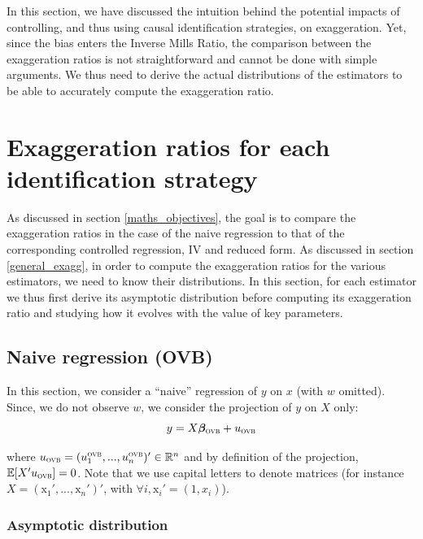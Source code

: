 \documentclass[a4paper, 11pt]{report}
\begin{document}
			In this section, we have discussed the intuition behind the potential impacts of controlling, and thus using causal identification strategies, on exaggeration. Yet, since the bias enters the Inverse Mills Ratio, the comparison between the exaggeration ratios is not straightforward and cannot be done with simple arguments. We thus need to derive the actual distributions of the estimators to be able to accurately compute the exaggeration ratio.
			

	\section{Exaggeration ratios for each identification strategy}
	
		As discussed in section \ref{maths_objectives}, the goal is to compare the exaggeration ratios in the case of the naive regression to that of the corresponding controlled regression, IV and reduced form. As discussed in section \ref{general_exagg}, in order to compute the exaggeration ratios for the various estimators, we need to know their distributions. In this section, for each estimator we thus first derive its asymptotic distribution before computing its exaggeration ratio and studying how it evolves with the value of key parameters. 

		
		\subsection{Naive regression (OVB)}\label{formal_proof_ovb}
		
			In this section, we consider a ``naive'' regression of $y$ on $x$ (with $w$ omitted). Since, we do not observe $w$, we consider the projection of $y$ on $X$ only:
						~
						\begin{equation}\label{maths_eq_ovb}
							y = X\bm{\beta}_{\textsc{ovb}} + u_{\textsc{ovb}}
						\end{equation}
				
						where $u_{\textsc{ovb}} = (u^{\textsc{ovb}}_{1}, ... , u^{\textsc{ovb}}_{n})' \in \mathbb{R}^{n}$ and by definition of the projection, $\mathbb{E}[X'u_{\textsc{ovb}}] = 0$. Note that we use capital letters to denote matrices (for instance $X = (\text{x}_{1}', ..., \text{x}_{n}')'$, with $\forall i, \text{x}_{i}' = (1, x_{i})$). 
		
			\subsubsection{Asymptotic distribution}
		
\end{document}
